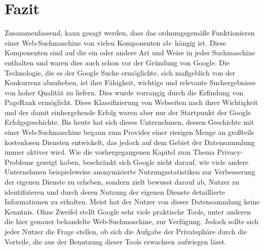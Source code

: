 \documentclass[12pt, a4paper]{llncs}
\begin{document}
	\section{Fazit}
	Zusammenfassend, kann gesagt werden, dass das ordnungsgemäße Funktionieren einer Web-Suchmaschine von vielen Komponenten ab- hängig ist. Diese Komponenten
	sind auf die ein oder andere Art und Weise in jeder Suchmaschine enthalten und waren dies auch schon vor der Gründung von Google. Die Technologie, die es
	der Google Suche ermöglichte, sich maßgeblich von der Konkurrenz abzuheben, ist ihre Fähigkeit, wichtige und relevante Suchergebnisse von hoher Qualität zu 
	liefern. Dies wurde vorrangig durch die Erfindung von PageRank ermöglicht. Diese Klassifizierung von Webseiten nach ihrer Wichtigkeit und der damit einhergehende
	Erfolg waren aber nur der Startpunkt der Google Erfolgsgeschichte. Bis heute hat sich dieses Unternehmen, dessen Geschichte mit einer Web-Suchmaschine begann zum Provider einer riesigen Menge an großteils kostenlosen Diensten entwickelt, das jedoch auf dem Gebiet der Datensammlung immer aktiver wird. Wie die vorhergegangenen
	Kapitel zum Thema Privacy-Probleme gezeigt haben, beschränkt sich Google nicht darauf, wie viele andere Unternehmen beispielsweise anonymisierte Nutzungsstatistiken zur 
	Verbesserung der eigenen Dienste zu erheben, sondern zielt bewusst darauf ab, Nutzer zu identifizieren und durch deren Nutzung der eigenen Dienste detaillierte
	Informationen zu erhalten. Meist hat der Nutzer von dieser Datensammlung keine Kenntnis.
	Ohne Zweifel stellt Google sehr viele praktische Tools, unter anderen die hier genauer behandelte Web-Suchmaschine, zur Verfügung. Jedoch sollte sich jeder Nutzer die
	Frage stellen, ob sich die Aufgabe der Privatsphäre durch die Vorteile, die aus der Benutzung dieser Tools erwachsen aufwiegen lässt.
	\newpage	
	\printbibliography[title={Bibliographie}]
	
\end{document}
